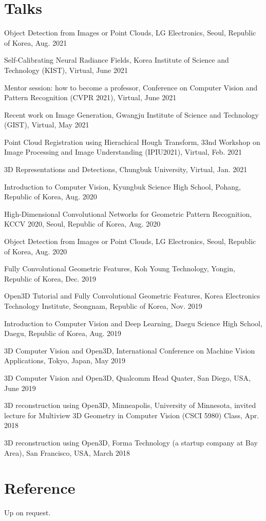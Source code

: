 \documentclass[letterpaper,11pt]{article}
\newcommand{\resumeItem}[1]{
  \small{
  \item{#1 \vspace{-2pt}}
  }
}
\newcommand{\resumeItemListStart}{\begin{itemize}}
\newcommand{\resumeItemListEnd}{\end{itemize}\vspace{-5pt}}
\begin{document}
\section{Talks}
\resumeItemListStart
    \resumeItem{Object Detection from Images or Point Clouds, LG Electronics, Seoul, Republic of Korea, Aug. 2021}
    \resumeItem{Self-Calibrating Neural Radiance Fields, Korea Institute of Science and Technology (KIST), Virtual, June 2021}
    \resumeItem{Mentor session: how to become a professor, Conference on Computer Vision and Pattern Recognition (CVPR 2021), Virtual, June 2021}
    \resumeItem{Recent work on Image Generation, Gwangju Institute of Science and Technology (GIST), Virtual, May 2021}
    \resumeItem{Point Cloud Registration using Hierachical Hough Transform, 33nd Workshop on Image Processing and Image Understanding (IPIU2021), Virtual, Feb. 2021}
    \resumeItem{3D Representations and Detections, Chungbuk University, Virtual, Jan. 2021}
    \resumeItem{Introduction to Computer Vision, Kyungbuk Science High School, Pohang, Republic of Korea, Aug. 2020}
    \resumeItem{High-Dimensional Convolutional Networks for Geometric Pattern Recognition, KCCV 2020, Seoul, Republic of Korea, Aug. 2020}
    \resumeItem{Object Detection from Images or Point Clouds, LG Electronics, Seoul, Republic of Korea, Aug. 2020}
    \resumeItem{Fully Convolutional Geometric Features, Koh Young Technology, Yongin, Republic of Korea, Dec. 2019}
    \resumeItem{Open3D Tutorial and Fully Convolutional Geometric Features, Korea Electronics Technology Institute, Seongnam, Republic of Korea, Nov. 2019}
    \resumeItem{Introduction to Computer Vision and Deep Learning, Daegu Science High School, Daegu, Republic of Korea, Aug. 2019}
    \resumeItem{3D Computer Vision and Open3D, International Conference on Machine Vision Applications, Tokyo, Japan, May 2019}
    \resumeItem{3D Computer Vision and Open3D, Qualcomm Head Quater, San Diego, USA, June 2019}
    \resumeItem{3D reconstruction using Open3D, Minneapolis, University of Minnesota, invited lecture for Multiview 3D Geometry in Computer Vision (CSCI 5980) Class, Apr. 2018}
    \resumeItem{3D reconstruction using Open3D, Forma Technology (a startup company at Bay Area), San Francisco, USA, March 2018}
\resumeItemListEnd





\section{Reference}
\resumeItemListStart
\resumeItem{Up on request.}
\resumeItemListEnd
\end{document}

